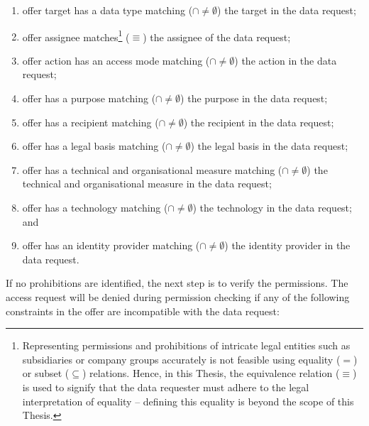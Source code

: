 \begin{enumerate}
    \item offer target has a data type matching ($\cap\neq\emptyset$) the target in the data request;
    \item offer assignee matches\footnote{Representing permissions and prohibitions of intricate legal entities such as subsidiaries or company groups accurately is not feasible using equality ($=$) or subset ($\subseteq$) relations. Hence, in this Thesis, the equivalence relation ($\equiv$) is used to signify that the data requester must adhere to the legal interpretation of equality -- defining this equality is beyond the scope of this Thesis.} ($\equiv$) the assignee of the data request; 
    \item offer action has an access mode matching ($\cap\neq\emptyset$) the action in the data request;
    \item offer has a purpose matching ($\cap\neq\emptyset$) the purpose in the data request;
    \item offer has a recipient matching ($\cap\neq\emptyset$) the recipient in the data request;
    \item offer has a legal basis matching ($\cap\neq\emptyset$) the legal basis in the data request;
    \item offer has a technical and organisational measure matching ($\cap\neq\emptyset$) the technical and organisational measure in the data request;
    \item offer has a technology matching ($\cap\neq\emptyset$) the technology in the data request; and
    \item offer has an identity provider matching ($\cap\neq\emptyset$) the identity provider in the data request.
\end{enumerate}

If no prohibitions are identified, the next step is to verify the permissions.
The access request will be denied during permission checking if any of the following constraints in the offer are incompatible with the data request:

